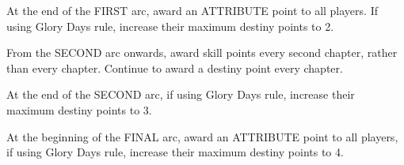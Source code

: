 \begin{displayquote}
    At the end of the FIRST arc, award an ATTRIBUTE point to all players. If using Glory Days rule, increase their maximum destiny points to 2.

    From the SECOND arc onwards, award skill points every second chapter, rather than every chapter. Continue to award a destiny point every chapter.

    At the end of the SECOND arc, if using Glory Days rule, increase their maximum destiny points to 3.

    At the beginning of the FINAL arc, award an ATTRIBUTE point to all players, if using Glory Days rule, increase their maximum destiny points to 4.
\end{displayquote}
